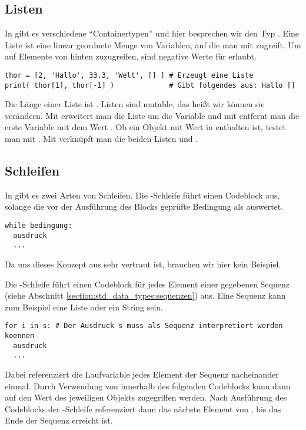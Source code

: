 \subsection{Listen}
\label{section:crashkurs:listen}
In \Python gibt es verschiedene ``Containertypen'' und hier besprechen wir den Typ .
Eine Liste  ist eine linear geordnete Menge von Variablen, auf die man mit  zugreift.
Um auf Elemente von hinten zuzugreifen, sind negative Werte für  erlaubt.
\begin{lstlisting}
thor = [2, 'Hallo', 33.3, 'Welt', [] ] # Erzeugt eine Liste
print( thor[1], thor[-1] )             # Gibt folgendes aus: Hallo []
\end{lstlisting}
Die Länge einer Liste ist .
Listen sind mutable, das heißt wir können sie verändern.
Mit  erweitert man die Liste  um die Variable  und mit  entfernt man die erste Variable mit dem Wert .
Ob ein Objekt mit Wert  in  enthalten ist, testet man mit .
Mit  verknüpft man die beiden Listen  und .


\subsection{Schleifen}
\label{section:crashkurs:schleifen}
In \Python gibt es zwei Arten von Schleifen.
Die -Schleife führt einen Codeblock aus, solange die vor der Ausführung des Blocks geprüfte Bedingung als  auswertet.
\begin{lstlisting}
while bedingung:
  ausdruck
  ...
\end{lstlisting}
Da uns dieses Konzept aus \CC sehr vertraut ist, brauchen wir hier kein Beispiel.

Die -Schleife führt einen Codeblock für jedes Element einer gegebenen Sequenz (siehe Abschnitt \ref{section:std_data_types:sequenzen}) aus.
Eine Sequenz kann zum Beispiel eine Liste oder ein String sein.
\begin{lstlisting}
for i in s: # Der Ausdruck s muss als Sequenz interpretiert werden koennen
  ausdruck
  ...
\end{lstlisting}
Dabei referenziert die Laufvariable  jedes Element der Sequenz  nacheinander einmal. Durch Verwendung von  innerhalb 
des folgenden Codeblocks kann 
dann auf den Wert des jeweiligen Objekts zugegriffen werden. Nach Ausführung des Codeblocks der -Schleife referenziert 
 dann das nächste Element von , bis das Ende der Sequenz erreicht ist. 

